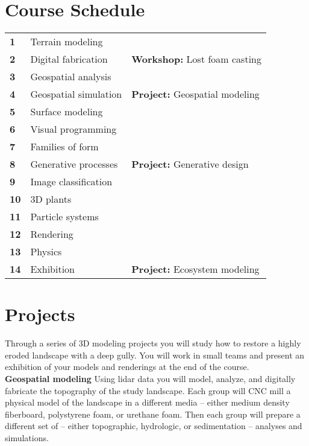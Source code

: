 \documentclass[11pt,article,oneside]{memoir}
\begin{document}

\section{Course Schedule}

\begin{table}[H]
\small
\begin{tabular}{l l @{\hskip 1cm}l}
%
\textbf{1} & Terrain modeling\\
\textbf{2} & Digital fabrication & \textbf{Workshop:} Lost foam casting\\
\textbf{3} & Geospatial analysis\\
\textbf{4} & Geospatial simulation & \textbf{Project:} Geospatial modeling\\
%
\textbf{5} & Surface modeling\\
\textbf{6} & Visual programming\\
\textbf{7} & Families of form\\
\textbf{8} & Generative processes & \textbf{Project:} Generative design\\
%
\textbf{9} & Image classification\\
\textbf{10} & 3D plants\\
\textbf{11} & Particle systems\\
\textbf{12} & Rendering\\
\textbf{13} & Physics\\
\textbf{14} & Exhibition & \textbf{Project:} Ecosystem modeling\\
%
\end{tabular}
\end{table}


\section{Projects}
Through a series of 3D modeling projects you will 
study how to restore a highly eroded landscape with a deep gully.
You will work in small teams and present an exhibition of your
models and renderings at the end of the course.\\


\noindent \textbf{Geospatial modeling}
Using lidar data you will model, analyze, and digitally fabricate
the topography of the study landscape. 
%
Each group will CNC mill a physical model of the landscape
in a different media -- either medium density fiberboard, 
polystyrene foam, or urethane foam.
Then each group will prepare a different set of 
-- either topographic, hydrologic, or sedimentation -- 
analyses and simulations.\\
\end{document}

